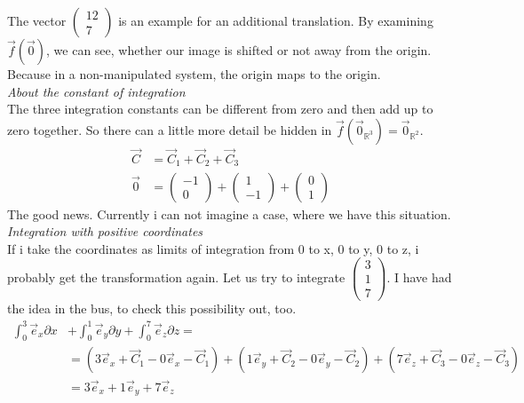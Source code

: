 \documentclass[a4paper]{article}
\begin{document}
\begin{Example}
The vector $\begin{pmatrix}12\\7\end{pmatrix}$ is an example for an additional translation. By examining $\vec{f}(\vec{0})$, we can see, whether our image is shifted or not away from the origin. Because in a non-manipulated system, the origin maps to the origin. \\

\emph{About the constant of integration}\\

The three integration constants can be different from zero and then add up to zero together. So there can a little more detail be hidden in $\vec{f}(\vec{0}_{\mathbb{R}^{3}}) = \vec{0}_{\mathbb{R}^{2}}$.\\
\begin{displaymath}
\begin{align}
\vec{C} &= \vec{C}_{1} + \vec{C}_{2} + \vec{C}_{3} \\
\vec{0} &= \begin{pmatrix}-1\\0\end{pmatrix}+\begin{pmatrix}1\\-1\end{pmatrix}+\begin{pmatrix}0\\1\end{pmatrix}
\end{align}
\end{displaymath}
The good news. Currently i can not imagine a case, where we have this situation.\\

\emph{Integration with positive coordinates}\\

If i take the coordinates as limits of integration from 0 to x, 0 to y, 0 to z, i probably get the transformation again.
Let us try to integrate $\begin{pmatrix}3\\1\\7\end{pmatrix}$. I have had the idea in the bus, to check this possibility out, too.\\

\begin{displaymath}
\begin{align}
\int_{0}^{3}\vec{e}_{x}\partial{x} &+
\int_{0}^{1}\vec{e}_{y}\partial{y} +
\int_{0}^{7}\vec{e}_{z}\partial{z} =\\
&= (3\vec{e}_{x}+\vec{C}_{1}-0\vec{e}_{x}-\vec{C}_{1}) + (1\vec{e}_{y}+\vec{C}_{2}-0\vec{e}_{y}-\vec{C}_{2}) + (7\vec{e}_{z}+\vec{C}_{3}-0\vec{e}_{z}-\vec{C}_{3})\\
&= 3\vec{e}_{x} + 1\vec{e}_{y} + 7\vec{e}_{z}\\
\end{align}
\end{displaymath}


\end{Example}
\end{document}
